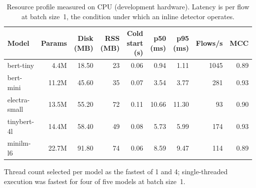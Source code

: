 \begin{table}[htbp]
\centering
\caption{Resource profile measured on CPU (development hardware). Latency is per flow at batch size~1, the condition under which an inline detector operates.}
\label{tab:resource}
\small
\begin{tabular}{lrrrrrrrr}
\toprule
Model & Params & Disk (MB) & RSS (MB) & Cold start (s) & p50 (ms) & p95 (ms) & Flows/s & MCC \\
\midrule
bert-tiny & 4.4M & 18.50 & 23 & 0.06 & 0.94 & 1.11 & 1045 & 0.89 \\
bert-mini & 11.2M & 45.60 & 35 & 0.07 & 3.54 & 3.77 & 281 & 0.93 \\
electra-small & 13.5M & 55.20 & 72 & 0.11 & 10.66 & 11.30 & 93 & 0.90 \\
tinybert-4l & 14.4M & 58.40 & 49 & 0.08 & 5.73 & 5.99 & 174 & 0.93 \\
minilm-l6 & 22.7M & 91.80 & 74 & 0.06 & 8.59 & 9.47 & 114 & 0.89 \\
\bottomrule
\end{tabular}

\vspace{2pt}
\footnotesize Thread count selected per model as the fastest of 1 and 4; single-threaded execution was fastest for four of five models at batch size~1.
\end{table}
